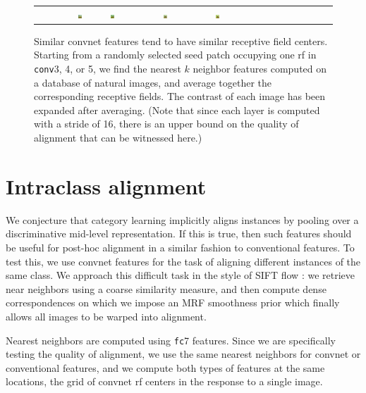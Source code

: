 \documentclass{article} %
\begin{document}
\begin{figure}
{\begin{tabular}{rcccc@{\hskip 5pt}cccc@{\hskip 5pt}cccc}
\includegraphics[width=0.08\textwidth]{figures/rfavg_conv5_1_500} &
\includegraphics[width=0.08\textwidth]{figures/rfavg_conv5_2_500} &
\includegraphics[width=0.08\textwidth]{figures/rfavg_conv5_3_500} &
\includegraphics[width=0.08\textwidth]{figures/rfavg_conv5_4_500}
\end{tabular}
}
\caption{
Similar convnet features tend to have similar receptive field centers.
Starting from a randomly selected seed patch occupying one rf in
\texttt{conv}3, 4, or 5, we find the nearest $k$ neighbor features computed on a
database of natural images, and average together the corresponding receptive
fields.
The contrast of each image has been expanded after averaging.
(Note that since each layer is computed with a stride of 16, there is an
upper bound on the quality of alignment that can be witnessed here.)
}
\label{fig:rfavg}
\end{figure}



\section{Intraclass alignment}
\label{sec:flow}
We conjecture that category learning implicitly aligns instances by pooling over
a discriminative mid-level representation.
If this is true, then such features should be useful for post-hoc alignment in a
similar fashion to conventional features.
To test this, we use convnet features for the task of aligning different instances
of the same class.
We approach this difficult task in the style of SIFT flow \cite{sift-flow}: we
retrieve near neighbors using a coarse similarity measure, and then compute
dense correspondences on which we impose an MRF smoothness prior which finally
allows all images to be warped into alignment.

Nearest neighbors are computed using \texttt{fc}7 features.
Since we are specifically testing the quality of alignment, we use the
same nearest neighbors for convnet or conventional features, and we compute both
types of features at the same locations, the grid of convnet rf centers in the
response to a single image.
\end{document}
